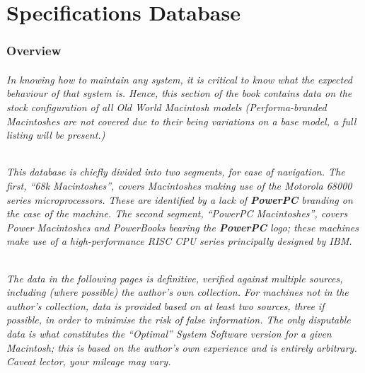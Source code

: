 
\part{Specifications Database}

\section{Overview}

\paragraph{%
In knowing how to maintain any system, it is critical to know what the expected %
behaviour of that system is. Hence, this section of the book contains data on the %
stock configuration of all Old World Macintosh models (Performa-branded %
Macintoshes are not covered due to their being variations on a base model, %
a full listing will be present.) %
}

\paragraph{%
This database is chiefly divided into two segments, for ease of navigation. The %
first, ``68k Macintoshes'', covers Macintoshes making use of the Motorola 68000 %
series microprocessors. These are identified by a lack of \textsl{\textbf{\textrm{PowerPC}}} %
branding on the case of the machine. The second segment, ``PowerPC Macintoshes'', %
covers Power Macintoshes and PowerBooks bearing the \textsl{\textbf{\textrm{PowerPC}}} logo; %
these machines make use of a high-performance RISC CPU series principally designed by IBM. %
}

\paragraph{%
The data in the following pages is definitive, verified against multiple sources, including %
(where possible) the author's own collection. For machines not in the author's collection, %
data is provided based on at least two sources, three if possible, in order to minimise the %
risk of false information. The only disputable data is what constitutes the ``Optimal'' %
System Software version for a given Macintosh; this is based on the author's own %
experience and is entirely arbitrary. Caveat lector, your mileage may vary. %
}

\cleardoublepage


\cleardoublepage
